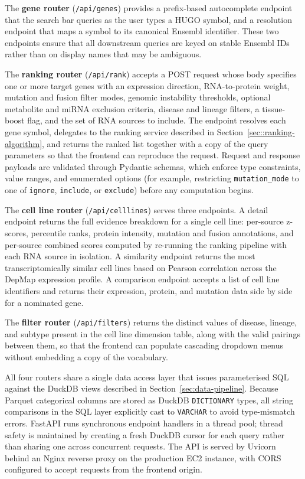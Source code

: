 The \textbf{gene router} (\texttt{/api/genes}) provides a prefix-based autocomplete endpoint that the search bar queries as the user types a HUGO symbol, and a resolution endpoint that maps a symbol to its canonical Ensembl identifier. These two endpoints ensure that all downstream queries are keyed on stable Ensembl IDs rather than on display names that may be ambiguous.

The \textbf{ranking router} (\texttt{/api/rank}) accepts a \textsc{POST} request whose body specifies one or more target genes with an expression direction, RNA-to-protein weight, mutation and fusion filter modes, genomic instability thresholds, optional metabolite and miRNA exclusion criteria, disease and lineage filters, a tissue-boost flag, and the set of RNA sources to include. The endpoint resolves each gene symbol, delegates to the ranking service described in Section~\ref{sec::ranking-algorithm}, and returns the ranked list together with a copy of the query parameters so that the frontend can reproduce the request. Request and response payloads are validated through Pydantic schemas, which enforce type constraints, value ranges, and enumerated options (for example, restricting \texttt{mutation\_mode} to one of \texttt{ignore}, \texttt{include}, or \texttt{exclude}) before any computation begins.

The \textbf{cell line router} (\texttt{/api/celllines}) serves three endpoints. A detail endpoint returns the full evidence breakdown for a single cell line: per-source z-scores, percentile ranks, protein intensity, mutation and fusion annotations, and per-source combined scores computed by re-running the ranking pipeline with each RNA source in isolation. A similarity endpoint returns the most transcriptomically similar cell lines based on Pearson correlation across the DepMap expression profile. A comparison endpoint accepts a list of cell line identifiers and returns their expression, protein, and mutation data side by side for a nominated gene.

The \textbf{filter router} (\texttt{/api/filters}) returns the distinct values of disease, lineage, and subtype present in the cell line dimension table, along with the valid pairings between them, so that the frontend can populate cascading dropdown menus without embedding a copy of the vocabulary.

All four routers share a single data access layer that issues parameterised SQL against the DuckDB views described in Section~\ref{sec:data-pipeline}. Because Parquet categorical columns are stored as DuckDB \texttt{DICTIONARY} types, all string comparisons in the SQL layer explicitly cast to \texttt{VARCHAR} to avoid type-mismatch errors. FastAPI runs synchronous endpoint handlers in a thread pool; thread safety is maintained by creating a fresh DuckDB cursor for each query rather than sharing one across concurrent requests. The API is served by Uvicorn behind an Nginx reverse proxy on the production EC2 instance, with CORS configured to accept requests from the frontend origin.


